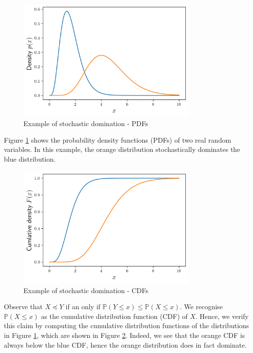 
\begin{figure}[h]
	\centering
	\includegraphics[width=0.8\textwidth]{./figures/stochastic_domination_pdf.png}
	\caption{Example of stochastic domination - PDFs}
	\label{fig:stochDomPDFs}
\end{figure}

Figure \ref{fig:stochDomPDFs} shows the probability density functions (PDFs) of two real random variables. In this example, the orange distribution stochastically dominates the blue distribution.

\begin{figure}[h]
	\centering
	\includegraphics[width=0.8\textwidth]{./figures/stochastic_domination_cdf.png}
	\caption{Example of stochastic domination - CDFs}
	\label{fig:stochDomCDFs}
\end{figure}

Observe that $X \preceq Y$ if an only if $\mathbb{P}(Y \leq x) \leq \mathbb{P}(X \leq x)$. We recognise $\mathbb{P}(X \leq x)$ as the cumulative distribution function (CDF) of $X$. Hence, we verify this claim by computing the cumulative  distribution functions of the distributions in Figure \ref{fig:stochDomPDFs}, which are shown in Figure \ref{fig:stochDomCDFs}. Indeed, we see that the orange CDF is always below the blue CDF, hence the orange distribution does in fact dominate. %

